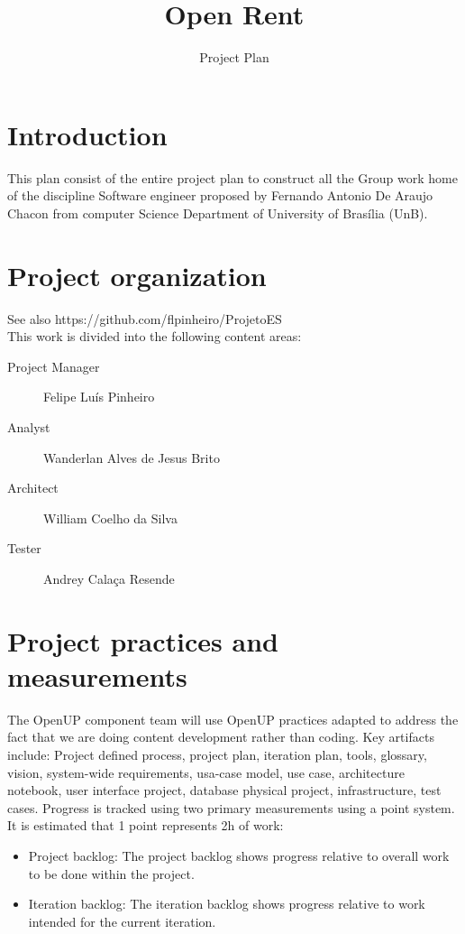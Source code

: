 \documentclass{article}%
\begin{document}
\title{Open Rent}
\author{Project Plan}
\date{}
\maketitle

\section{Introduction}

This plan consist of the entire project plan to construct all the Group work home of the  discipline Software engineer proposed by Fernando Antonio De Araujo Chacon from computer Science Department of University of Brasília (UnB).

\section{Project organization}

See also https://github.com/flpinheiro/ProjetoES \\
This work is divided into the following content areas:\\
\begin{description}
	\item[Project Manager] Felipe Luís Pinheiro
	\item[Analyst] Wanderlan Alves de Jesus Brito
	\item[Architect] William Coelho da Silva
	\item[Tester] Andrey Calaça Resende
\end{description}

\section{Project practices and measurements}

The OpenUP component team will use OpenUP practices adapted to address the fact that we are doing content development rather than coding. Key artifacts include: Project defined process, project plan, iteration plan, tools, glossary, vision, system-wide requirements, usa-case model, use case, architecture notebook, user interface  project, database physical project, infrastructure, test cases.
Progress is tracked using two primary measurements using a point system. It is estimated that 1 point represents 2h of work:
\begin{itemize}
	\item Project backlog: The project backlog shows progress relative to overall work to be done within the project.
	\item Iteration backlog: The iteration backlog shows progress relative to work intended for the current iteration.
\end{itemize}
\end{document}
